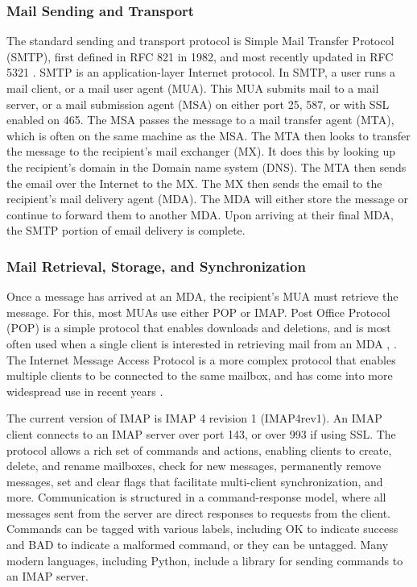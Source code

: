 \documentclass[pageno]{jpaper}
\begin{document}
\subsubsection{Mail Sending and Transport}
The standard sending and transport protocol is Simple Mail Transfer Protocol (SMTP), first defined in RFC 821 \cite{postel1982rfc} in 1982, and most recently updated in RFC 5321 \cite{klensin2008rfc}. SMTP is an application-layer Internet protocol. In SMTP, a user runs a mail client, or a mail user agent (MUA). This MUA submits mail to a mail server, or a mail submission agent (MSA) on either port 25, 587, or with SSL enabled on 465. The MSA passes the message to a mail transfer agent (MTA), which is often on the same machine as the MSA. The MTA then looks to transfer the message to the recipient's mail exchanger (MX). It does this by looking up the recipient's domain in the Domain name system (DNS). The MTA then sends the email over the Internet to the MX. The MX then sends the email to the recipient's mail delivery agent (MDA). The MDA will either store the message or continue to forward them to another MDA. Upon arriving at their final MDA, the SMTP portion of email delivery is complete.


\label{legacyimap}
\subsubsection{Mail Retrieval, Storage, and Synchronization}
Once a message has arrived at an MDA, the recipient's MUA must retrieve the message. For this, most MUAs use either POP or IMAP. Post Office Protocol (POP) is a simple protocol that enables downloads and deletions, and is most often used when a single client is interested in retrieving mail from an MDA \cite{reynolds1984post}, \cite{myers1996post}. The Internet Message Access Protocol is a more complex protocol that enables multiple clients to be connected to the same mailbox, and has come into more widespread use in recent years \cite{rfc3501}.

The current version of IMAP is IMAP 4 revision 1 (IMAP4rev1). An IMAP client connects to an IMAP server over port 143, or over 993 if using SSL. The protocol allows a rich set of commands and actions, enabling clients to create, delete, and rename mailboxes, check for new messages, permanently remove messages, set and clear flags that facilitate multi-client synchronization, and more. Communication is structured in a command-response model, where all messages sent from the server are direct responses to requests from the client. Commands can be tagged with various labels, including OK to indicate success and BAD to indicate a malformed command, or they can be untagged. Many modern languages, including Python, include a library for sending commands to an IMAP server.
\end{document}
